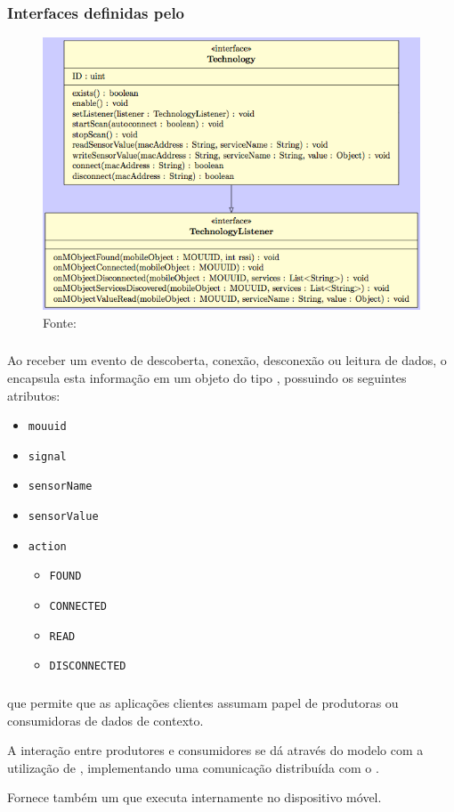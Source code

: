 \documentclass[aspectratio=169]{beamer}
\begin{document}
\begin{frame}
	\frametitle{Interfaces definidas pelo \stwopa}
	\begin{figure}[htb]
		\centering
		\includegraphics[width=0.55\linewidth]{img/technology-interface.png}
		\caption{Fonte: \cite{talavera:et-al:2015}}
	\end{figure}
\end{frame}

\begin{frame}
	\frametitle{\sensordata}
	Ao receber um evento de descoberta, conexão, desconexão ou leitura de dados, o \stwopa encapsula esta informação em um objeto do tipo \sensordata, possuindo os seguintes atributos:
	\begin{itemize}
		\item \texttt{mouuid}

		\item \texttt{signal}

		\item \texttt{sensorName}

		\item \texttt{sensorValue}
			
		\item \texttt{action}
		\begin{itemize}

			\item \texttt{FOUND}

			\item \texttt{CONNECTED}

			\item \texttt{READ}

			\item \texttt{DISCONNECTED}

		\end{itemize}
	\end{itemize}
\end{frame}

\begin{frame}
	\frametitle{\cddl}
	\Middleware \iomt que permite que as aplicações clientes assumam papel de produtoras ou consumidoras de dados de contexto.
	
	\bigskip
	A interação entre produtores e consumidores se dá através do modelo \pubsub com a utilização de \brokers, implementando uma comunicação distribuída com o \mqtt.
	\bigskip
	
	Fornece também um \ubroker que executa internamente no dispositivo móvel.
\end{frame}
\end{document}
